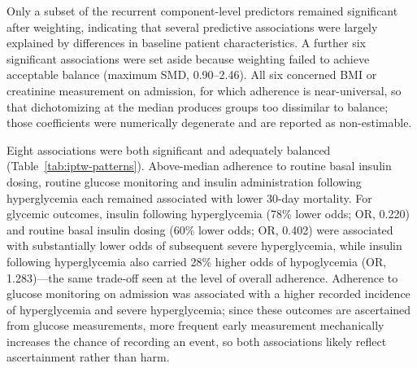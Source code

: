 Only a subset of the recurrent component-level predictors remained significant
after weighting, indicating that several predictive associations were largely
explained by differences in baseline patient characteristics. A further six
significant associations were set aside because weighting failed to achieve
acceptable balance (maximum SMD, 0.90--2.46). All six concerned BMI or
creatinine measurement on admission, for which adherence is near-universal, so
that dichotomizing at the median produces groups too dissimilar to balance;
those coefficients were numerically degenerate and are reported as
non-estimable.

Eight associations were both significant and adequately balanced
(Table~\ref{tab:iptw-patterns}). Above-median adherence to routine basal
insulin dosing, routine glucose monitoring and insulin administration following
hyperglycemia each remained associated with lower 30-day mortality. For
glycemic outcomes, insulin following hyperglycemia (78\% lower odds; OR, 0.220)
and routine basal insulin dosing (60\% lower odds; OR, 0.402) were associated
with substantially lower odds of subsequent severe hyperglycemia, while insulin
following hyperglycemia also carried 28\% higher odds of hypoglycemia (OR,
1.283)---the same trade-off seen at the level of overall adherence. Adherence to glucose monitoring on
admission was associated with a higher recorded incidence of hyperglycemia and
severe hyperglycemia; since these outcomes are ascertained from glucose
measurements, more frequent early measurement mechanically increases the chance
of recording an event, so both associations likely reflect ascertainment rather
than harm.

